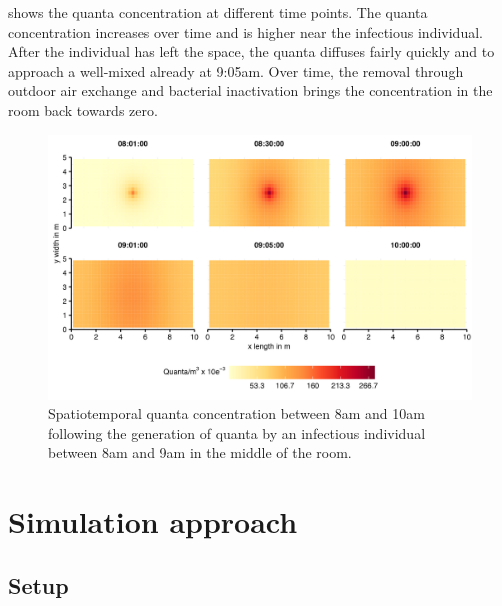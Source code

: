 \documentclass[fleqn,11pt]{wlscirep_supp}
\begin{document}
 shows the quanta concentration at different time points. The quanta concentration increases over time and is higher near the infectious individual. After the individual has left the space, the quanta diffuses fairly quickly and to approach a well-mixed already at 9:05am. Over time, the removal through outdoor air exchange and bacterial inactivation brings the concentration in the room back towards zero. 

\begin{figure}[!htpb]
    \centering
    \includegraphics{tests/stm_v2-toy_example.png}
    \caption{Spatiotemporal quanta concentration between 8am and 10am following the generation of quanta by an infectious individual between 8am and 9am in the middle of the room.}
    \label{fig:toy-example}
\end{figure}

\clearpage


\section{Simulation approach}\label{sec:estimation}

\subsection{Setup}\label{prep:building}
\end{document}
